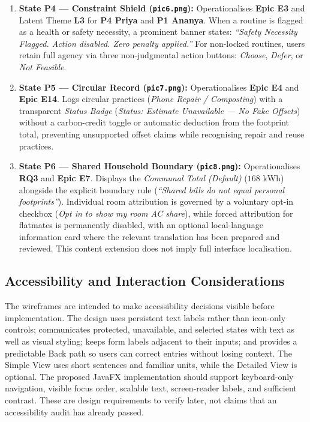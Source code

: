 \documentclass[12pt, a4paper]{article}
\begin{document}
\begin{enumerate}[leftmargin=1.8em, itemsep=0.3em]
    \item \textbf{State P4 --- Constraint Shield (\texttt{pic6.png}):} Operationalises \textbf{Epic E3} and Latent Theme \textbf{L3} for \textbf{P4 Priya} and \textbf{P1 Ananya}. When a routine is flagged as a health or safety necessity, a prominent banner states: \textit{``Safety Necessity Flagged. Action disabled. Zero penalty applied.''} For non-locked routines, users retain full agency via three non-judgmental action buttons: \textit{Choose}, \textit{Defer}, or \textit{Not Feasible}.
    \item \textbf{State P5 --- Circular Record (\texttt{pic7.png}):} Operationalises \textbf{Epic E4} and \textbf{Epic E14}. Logs circular practices (\textit{Phone Repair / Composting}) with a transparent \textit{Status Badge} (\textit{Status: Estimate Unavailable --- No Fake Offsets}) without a carbon-credit toggle or automatic deduction from the footprint total, preventing unsupported offset claims while recognising repair and reuse practices.
    \item \textbf{State P6 --- Shared Household Boundary (\texttt{pic8.png}):} Operationalises \textbf{RQ3} and \textbf{Epic E7}. Displays the \textit{Communal Total (Default)} ($168\text{ kWh}$) alongside the explicit boundary rule (\textit{``Shared bills do not equal personal footprints''}). Individual room attribution is governed by a voluntary opt-in checkbox (\textit{Opt in to show my room AC share}), while forced attribution for flatmates is permanently disabled, with an optional local-language information card where the relevant translation has been prepared and reviewed. This content extension does not imply full interface localisation.
\end{enumerate}


\subsection{Accessibility and Interaction Considerations}
The wireframes are intended to make accessibility decisions visible before implementation. The design uses persistent text labels rather than icon-only controls; communicates protected, unavailable, and selected states with text as well as visual styling; keeps form labels adjacent to their inputs; and provides a predictable Back path so users can correct entries without losing context. The Simple View uses short sentences and familiar units, while the Detailed View is optional. The proposed JavaFX implementation should support keyboard-only navigation, visible focus order, scalable text, screen-reader labels, and sufficient contrast. These are design requirements to verify later, not claims that an accessibility audit has already passed.
\end{document}

